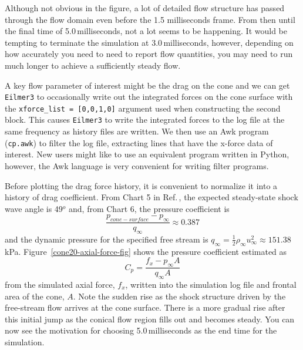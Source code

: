 \medskip
Although not obvious in the figure, a lot of detailed flow structure has passed through the flow domain
even before the 1.5 milliseconds frame.
From then until the final time of 5.0\,milliseconds, not a lot seems to be happening.
It would be tempting to terminate the simulation at 3.0\,milliseconds, however, 
depending on how accurately you need to need to report flow quantities, you may need to run much longer 
to achieve a sufficiently steady flow.

\medskip
A key flow parameter of interest might be the drag on the cone and we can get \verb!Eilmer3! to
occasionally write out the integrated forces on the cone surface with the \verb!xforce_list = [0,0,1,0]!
argument used when constructing the second block.
This causes \verb!Eilmer3! to write the integrated forces to the log file 
at the same frequency as history files are written.
We then use an Awk program (\verb!cp.awk!) to filter the log file, 
extracting lines that have the x-force data of interest.
New users might like to use an equivalent program written in Python, 
however, the Awk language is very convenient for writing filter programs.

\noindent \topbar
{}
\bottombar
      
\medskip
Before plotting the drag force history, 
it is convenient to normalize it into a history of drag coefficient.
From Chart 5 in Ref.\,\cite{ames_53}, the expected steady-state shock wave
angle is 49$^o$ and, from Chart 6, the pressure coefficient is
$$
\frac{p_{cone-surface} - p_{\infty}}{q_{\infty}} \approx 0.387
$$
and the dynamic pressure for the specified free stream is
$q_{\infty} = \frac{1}{2} \rho_{\infty} u_{\infty}^2 \approx 151.38$\,kPa.
Figure~\ref{cone20-axial-force-fig} shows the pressure coefficient 
estimated as
$$
C_p = \frac{f_x - p_{\infty} A}{q_{\infty} A}
$$
from the simulated axial force, $f_x$, written into the simulation log file
and frontal area of the cone, $A$.
Note the sudden rise as the shock structure driven by the free-stream flow
arrives at the cone surface.
There is a more gradual rise after this initial jump as the conical flow region
fills out and becomes steady.
You can now see the motivation for choosing 5.0\,milliseconds as the end time
for the simulation.

